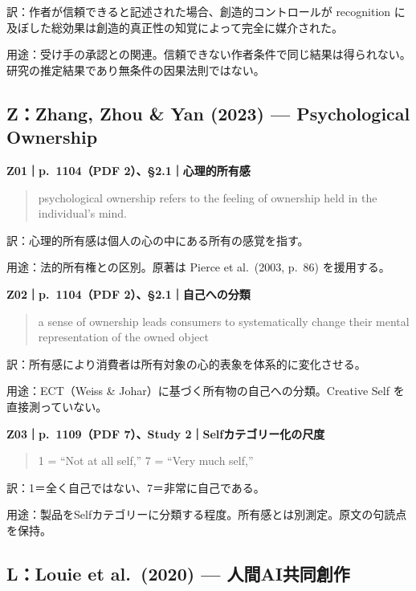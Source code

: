 \documentclass[
  11pt,
  a4paper,
]{article}
\begin{document}
訳：作者が信頼できると記述された場合、創造的コントロールが recognition
に及ぼした総効果は創造的真正性の知覚によって完全に媒介された。

用途：受け手の承認との関連。信頼できない作者条件で同じ結果は得られない。研究の推定結果であり無条件の因果法則ではない。

\subsection{Z：Zhang, Zhou \& Yan (2023) --- Psychological
Ownership}\label{zzhang-zhou-yan-2023-psychological-ownership}


\textbf{Z01｜p.~1104（PDF 2）、§2.1｜心理的所有感}

\begin{quote}
psychological ownership refers to the feeling of ownership held in the
individual's mind.
\end{quote}

訳：心理的所有感は個人の心の中にある所有の感覚を指す。

用途：法的所有権との区別。原著は Pierce et al.~(2003, p.~86)
を援用する。


\textbf{Z02｜p.~1104（PDF 2）、§2.1｜自己への分類}

\begin{quote}
a sense of ownership leads consumers to systematically change their
mental representation of the owned object
\end{quote}

訳：所有感により消費者は所有対象の心的表象を体系的に変化させる。

用途：ECT（Weiss \& Johar）に基づく所有物の自己への分類。Creative Self
を直接測っていない。


\textbf{Z03｜p.~1109（PDF 7）、Study 2｜Selfカテゴリー化の尺度}

\begin{quote}
1 = ``Not at all self,'' 7 = ``Very much self,''
\end{quote}

訳：1＝全く自己ではない、7＝非常に自己である。

用途：製品をSelfカテゴリーに分類する程度。所有感とは別測定。原文の句読点を保持。

\subsection{L：Louie et al.~(2020) ---
人間AI共同創作}\label{llouie-et-al.-2020-ux4ebaux9593aiux5171ux540cux5275ux4f5c}
\end{document}
